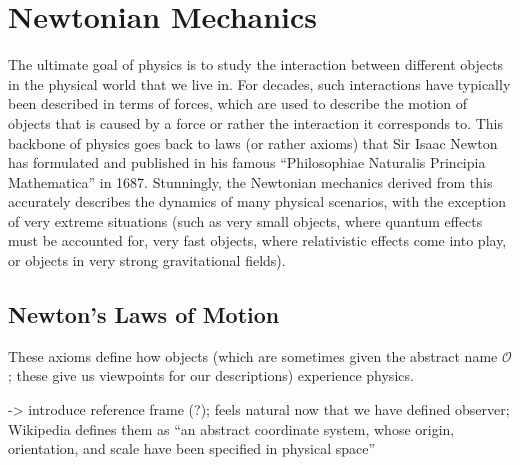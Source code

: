 \documentclass[../class_mech_main.tex]{subfiles}
\begin{document}
\chapter{Newtonian Mechanics}

The ultimate goal of physics is to study the interaction between different objects in the physical world that we live in. For decades, such interactions have typically been described in terms of forces, which are used to describe the motion of objects that is caused by a force or rather the interaction it corresponds to. This backbone of physics goes back to laws (or rather axioms) that Sir Isaac Newton has formulated and published in his famous \enquote{Philosophiae Naturalis Principia Mathematica} in 1687. Stunningly, the Newtonian mechanics derived from this accurately describes the dynamics of many physical scenarios, with the exception of very extreme situations (such as very small objects, where quantum effects must be accounted for, very fast objects, where relativistic effects come into play, or objects in very strong gravitational fields). 



\newpage



    \section{Newton's Laws of Motion}
% 
% 
These axioms define how objects (which are sometimes given the abstract name  $\mathcal{O}$; these give us viewpoints for our descriptions) experience physics. 

-> introduce reference frame (?); feels natural now that we have defined observer; Wikipedia defines them as \enquote{an abstract coordinate system, whose origin, orientation, and scale have been specified in physical space}
\end{document}
